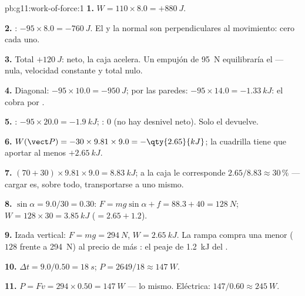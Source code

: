 \begin{solution}{pb:g11:work-of-force:1}
\textbf{1.} $W = 110 \times 8.0 = +\qty{880}{J}$.

\textbf{2.} : $-95 \times 8.0 = -\qty{760}{J}$. El  y la
 normal son perpendiculares al movimiento: cero cada uno.

\textbf{3.} Total $+\qty{120}{J}$:  neto, la caja acelera.
Un empujón de \qty{95}{N} equilibraría el  --- 
nula, velocidad constante y  total nulo.

\textbf{4.} Diagonal: $-95 \times 10.0 = -\qty{950}{J}$; por las
paredes: $-95 \times 14.0 = -\qty{1.33}{kJ}$: el  cobra por
.

\textbf{5.} : $-95 \times 20.0 = -\qty{1.9}{kJ}$; : $0$
(no hay desnivel neto). Solo el  devuelve.

\textbf{6.} $W(\vect P) = -30 \times 9.81 \times 9.0 =
-\qty{2.65}{kJ}$; la cuadrilla tiene que aportar al menos
$+\qty{2.65}{kJ}$.

\textbf{7.} $(70 + 30) \times 9.81 \times 9.0 = \qty{8.83}{kJ}$; a la
caja le corresponde $2.65/8.83 \approx 30\,\%$ --- cargar es, sobre todo,
transportarse a uno mismo.

\textbf{8.} $\sin\alpha = 9.0/30 = 0.30$:
$F = mg\sin\alpha + f = 88.3 + 40 = \qty{128}{N}$;
$W = 128 \times 30 = \qty{3.85}{kJ}$ ($= 2.65 + 1.2$).

\textbf{9.} Izada vertical: $F = mg = \qty{294}{N}$,
$W = \qty{2.65}{kJ}$. La rampa compra una  menor ($128$ frente a
\qty{294}{N}) al precio de más : el peaje de \qty{1.2}{kJ} del
.

\textbf{10.} $\Delta t = 9.0/0.50 = \qty{18}{s}$;
$P = 2649/18 \approx \qty{147}{W}$.

\textbf{11.} $P = Fv = 294 \times 0.50 = \qty{147}{W}$ --- lo mismo.
Eléctrica: $147/0.60 \approx \qty{245}{W}$.


\end{solution}
